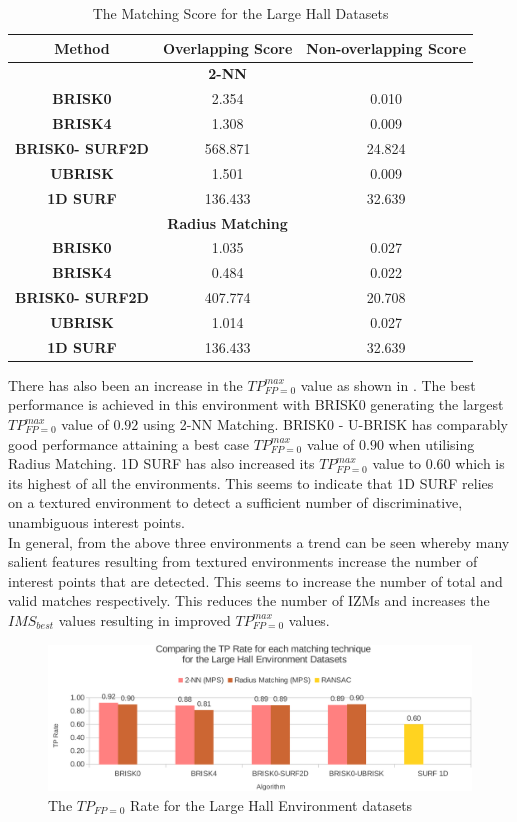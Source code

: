 \documentclass[11pt]{report}
\begin{document}
\begin{table}
\centering
\caption{The Matching Score for the Large Hall Datasets}
\begin{tabular}{|c|c|c|}
\hline 
\textbf{Method} & \textbf{Overlapping Score} & \textbf{Non-overlapping Score}\tabularnewline
\hline 
\hline 
 & \textbf{2-NN} & \tabularnewline
\hline 
\textbf{BRISK0} & 2.354 & 0.010\tabularnewline
\hline 
\textbf{BRISK4} & 1.308 & 0.009\tabularnewline
\hline 
\textbf{BRISK0- SURF2D} & 568.871 & 24.824\tabularnewline
\hline 
\textbf{UBRISK} & 1.501 & 0.009\tabularnewline
\hline 
\textbf{1D SURF} & 136.433 & 32.639\tabularnewline
\hline 
 & \textbf{Radius Matching} & \tabularnewline
\hline 
\textbf{BRISK0} & 1.035 & 0.027\tabularnewline
\hline 
\textbf{BRISK4} & 0.484 & 0.022\tabularnewline
\hline 
\textbf{BRISK0- SURF2D} & 407.774 & 20.708\tabularnewline
\hline 
\textbf{UBRISK} & 1.014 & 0.027\tabularnewline
\hline 
\textbf{1D SURF} & 136.433 & 32.639\tabularnewline
\hline 
\end{tabular}
\label{tab:lhMS}
\end{table}


There has also been an increase in the $TP_{FP=0}^{max}$ value as shown in . The best performance is achieved in this environment with BRISK0 generating the largest $TP_{FP=0}^{max}$ value of $0.92$ using 2-NN Matching. BRISK0 - U-BRISK has comparably good performance attaining a best case $TP_{FP=0}^{max}$ value of $0.90$ when utilising Radius Matching. 1D SURF has also increased its $TP_{FP=0}^{max}$ value to $0.60$ which is its highest of all the environments. This seems to indicate that 1D SURF relies on a textured environment to detect a sufficient number of discriminative, unambiguous interest points.\\

In general, from the above three environments a trend can be seen whereby many salient features resulting from textured environments increase the number of interest points that are detected. This seems to increase the number of total and valid matches respectively. This reduces the number of IZMs and increases the $IMS_{best}$ values resulting in improved $TP_{FP=0}^{max}$ values.\\

\begin{figure}
  \centering
    \includegraphics[width=1.0\textwidth]{../Drawings/Graphs/tp_rate_lh.pdf}
    \caption{The $TP_{FP=0}$ Rate for the Large Hall Environment datasets} 
    \label{fig:tp_rate_lh}
\end{figure}
\end{document}
